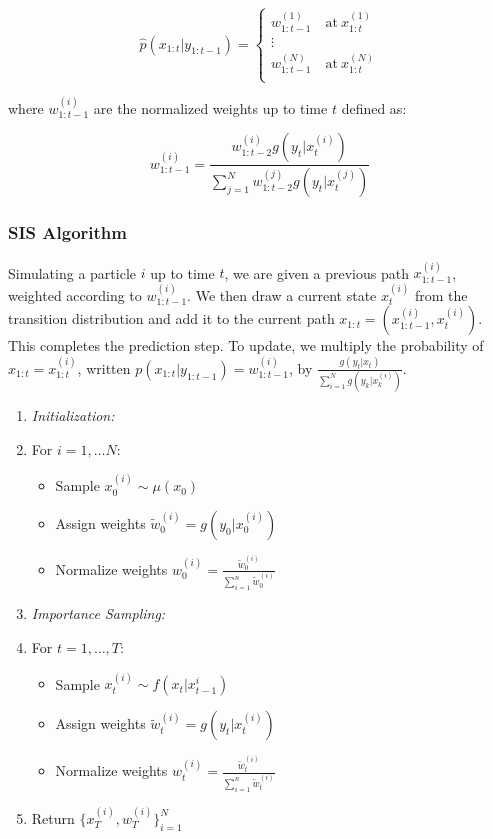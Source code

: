 \documentclass{article}
\begin{document}
\begin{equation}
\widehat{p}(x_{1:t}|y_{1:t-1}) = \begin{cases}
w_{1:t-1}^{(1)} \quad \text{at} \ x_{1:t}^{(1)} \\
\vdots \\
w_{1:t-1}^{(N)} \quad \text{at} \ x_{1:t}^{(N)} \\
\end{cases}
\end{equation}

\noindent
where $w_{1:t-1}^{(i)}$ are the normalized weights up to time $t$ defined as:

\begin{equation}
w_{1:t-1}^{(i)} = \frac{w_{1:t-2}^{(i)}g(y_{t}|x_{t}^{(i)})}{\sum_{j=1}^N w_{1:t-2}^{(j)}g(y_{t}|x_{t}^{(j)})}
\end{equation}


\subsubsection{SIS Algorithm}
Simulating a particle $i$ up to time $t$, we are given a previous path $x_{1:t-1}^{(i)}$, weighted according to $w_{1:t-1}^{(i)}$. We then draw a current state $x_{t}^{(i)}$ from the transition distribution and add it to the current path $x_{1:t} = (x_{1:t-1}^{(i)},x_t^{(i)})$. This completes the prediction step. To update, we multiply the probability of $x_{1:t} = x_{1:t}^{(i)}$, written $p(x_{1:t}|y_{1:t-1}) = w_{1:t-1}^{(i)}$, by $\frac{g(y_t|x_t)}{\sum_{i=1}^N g(y_k|x_k^{(i)})}$.

\begin{enumerate}
\item \textit{Initialization:}
\item[] For $i=1,\dots N$:
\begin{itemize}
\item[] Sample $x_0^{(i)} \sim \mu(x_0)$
\item[] Assign weights $\widetilde{w}_0^{(i)} = g(y_0|x_0^{(i)})$
\item[] Normalize weights $w_0^{(i)} = \frac{\widetilde{w}_0^{(i)}}{\sum_{i=1}^{n} \widetilde{w}_0^{(i)}}$
\end{itemize}
\item \textit{Importance Sampling:}
\item[] For $t=1,\dots,T$:
\begin{itemize}
\item[] Sample $x_t^{(i)} \sim f(x_t|x_{t-1}^{i})$
\item[] Assign weights $\widetilde{w}_t^{(i)} = g(y_t|x_t^{(i)})$
\item[] Normalize weights $w_t^{(i)} = \frac{\widetilde{w}_t^{(i)}}{\sum_{i=1}^{n} \widetilde{w}_t^{(i)}}$
\end{itemize}
\item Return $\{x_T^{(i)},w_T^{(i)}\}_{i=1}^N$
\end{enumerate}
\end{document}
